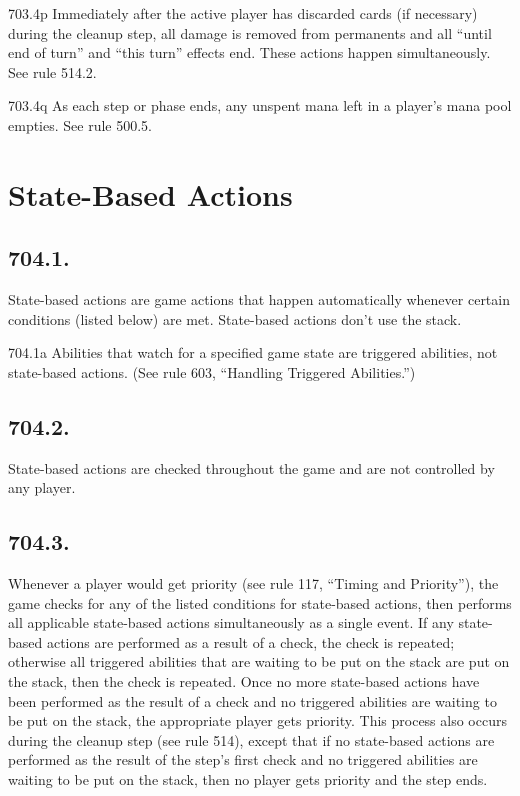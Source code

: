 703.4p Immediately after the active player has discarded cards (if necessary) during the cleanup step, all damage is removed from permanents and all “until end of turn” and “this turn” effects end. These actions happen simultaneously. See rule 514.2.

703.4q As each step or phase ends, any unspent mana left in a player’s mana pool empties. See rule 500.5.

\section{State-Based Actions}
\subsection*{704.1.}
State-based actions are game actions that happen automatically whenever certain conditions (listed below) are met. State-based actions don’t use the stack.

704.1a Abilities that watch for a specified game state are triggered abilities, not state-based actions. (See rule 603, “Handling Triggered Abilities.”)

\subsection*{704.2.}
State-based actions are checked throughout the game and are not controlled by any player.

\subsection*{704.3.}
Whenever a player would get priority (see rule 117, “Timing and Priority”), the game checks for any of the listed conditions for state-based actions, then performs all applicable state-based actions simultaneously as a single event. If any state-based actions are performed as a result of a check, the check is repeated; otherwise all triggered abilities that are waiting to be put on the stack are put on the stack, then the check is repeated. Once no more state-based actions have been performed as the result of a check and no triggered abilities are waiting to be put on the stack, the appropriate player gets priority. This process also occurs during the cleanup step (see rule 514), except that if no state-based actions are performed as the result of the step’s first check and no triggered abilities are waiting to be put on the stack, then no player gets priority and the step ends.

